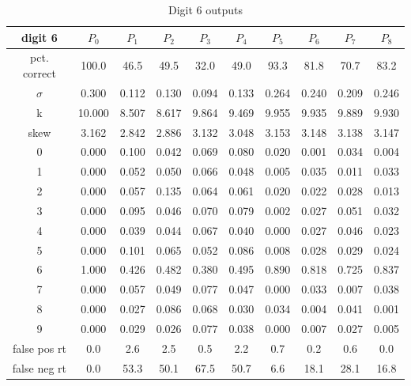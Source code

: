 \documentclass[conference]{IEEEtran}
\begin{document}
\begin{table}
\caption{Digit 6 outputs}
\centering
\begin{tabular}{ | c ||  c | c | c | c | c | c | c | c | c |}
 digit 6 & $P_0$ & $P_1$ & $P_2$ & $P_3$ & $P_4$ & $P_5$ & $P_6$ & $P_7$ & $P_8$ \\
\hline \hline
pct. correct  & 100.0 & 46.5 & 49.5 & 32.0 & 49.0 & 93.3 & 81.8 & 70.7 & 83.2 \\
\hline
$\sigma$ & 0.300& 0.112& 0.130& 0.094& 0.133& 0.264& 0.240& 0.209& 0.246 \\
\hline
k & 10.000& 8.507& 8.617& 9.864& 9.469& 9.955& 9.935& 9.889& 9.930 \\
\hline
skew & 3.162& 2.842& 2.886& 3.132& 3.048& 3.153& 3.148& 3.138& 3.147 \\
\hline
0 & 0.000 & 0.100 & 0.042 & 0.069 & 0.080 & 0.020 & 0.001 & 0.034 & 0.004 \\
\hline
1 & 0.000 & 0.052 & 0.050 & 0.066 & 0.048 & 0.005 & 0.035 & 0.011 & 0.033 \\
\hline
2 & 0.000 & 0.057 & 0.135 & 0.064 & 0.061 & 0.020 & 0.022 & 0.028 & 0.013 \\
\hline
3 & 0.000 & 0.095 & 0.046 & 0.070 & 0.079 & 0.002 & 0.027 & 0.051 & 0.032 \\
\hline
4 & 0.000 & 0.039 & 0.044 & 0.067 & 0.040 & 0.000 & 0.027 & 0.046 & 0.023 \\
\hline
5 & 0.000 & 0.101 & 0.065 & 0.052 & 0.086 & 0.008 & 0.028 & 0.029 & 0.024 \\
\hline
6 & 1.000 & 0.426 & 0.482 & 0.380 & 0.495 & 0.890 & 0.818 & 0.725 & 0.837 \\
\hline
7 & 0.000 & 0.057 & 0.049 & 0.077 & 0.047 & 0.000 & 0.033 & 0.007 & 0.038 \\
\hline
8 & 0.000 & 0.027 & 0.086 & 0.068 & 0.030 & 0.034 & 0.004 & 0.041 & 0.001 \\
\hline
9 & 0.000 & 0.029 & 0.026 & 0.077 & 0.038 & 0.000 & 0.007 & 0.027 & 0.005 \\
\hline
false pos rt & 0.0 & 2.6 & 2.5 & 0.5 & 2.2 & 0.7 & 0.2 & 0.6 & 0.0 \\
\hline
false neg rt & 0.0 & 53.3 & 50.1 & 67.5 & 50.7 & 6.6 & 18.1 & 28.1 & 16.8 \\
\hline
\end{tabular}
\label{table:digit6out}
\end{table}
\end{document}
